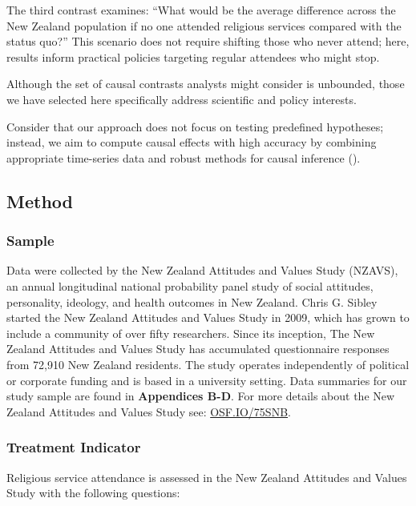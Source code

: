 \documentclass[
  single column]{article}
\begin{document}
The third contrast examines: ``What would be the average difference
across the New Zealand population if no one attended religious services
compared with the status quo?'' This scenario does not require shifting
those who never attend; here, results inform practical policies
targeting regular attendees who might stop.

Although the set of causal contrasts analysts might consider is
unbounded, those we have selected here specifically address scientific
and policy interests.

Consider that our approach does not focus on testing predefined
hypotheses; instead, we aim to compute causal effects with high accuracy
by combining appropriate time-series data and robust methods for causal
inference ().

\subsection{Method}\label{method}

\subsubsection{Sample}\label{sample}

Data were collected by the New Zealand Attitudes and Values Study
(NZAVS), an annual longitudinal national probability panel study of
social attitudes, personality, ideology, and health outcomes in New
Zealand. Chris G. Sibley started the New Zealand Attitudes and Values
Study in 2009, which has grown to include a community of over fifty
researchers. Since its inception, The New Zealand Attitudes and Values
Study has accumulated questionnaire responses from 72,910 New Zealand
residents. The study operates independently of political or corporate
funding and is based in a university setting. Data summaries for our
study sample are found in \textbf{Appendices B-D}. For more details
about the New Zealand Attitudes and Values Study see:
\href{https://doi.org/10.17605/OSF.IO/75SNB}{OSF.IO/75SNB}.

\subsubsection{Treatment Indicator}\label{treatment-indicator}

Religious service attendance is assessed in the New Zealand Attitudes
and Values Study with the following questions:
\end{document}
